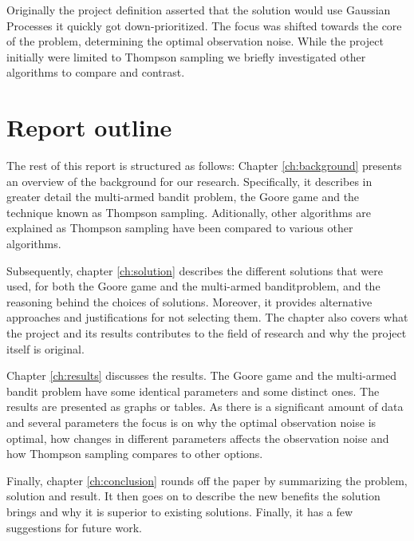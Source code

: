 Originally the project definition asserted that the solution would use Gaussian Processes it quickly got down-prioritized.
The focus was shifted towards the core of the problem, determining the optimal observation noise. While
the project initially were limited to Thompson sampling we briefly investigated other algorithms to compare
and contrast. 

\section{Report outline}
The rest of this report is structured as follows: Chapter
\ref{ch:background} presents an overview of the background for our research.
Specifically, it describes in greater detail the multi-armed bandit problem, the Goore game and the
technique known as Thompson sampling. Aditionally, other algorithms are explained as Thompson sampling
have been compared to various other algorithms.

Subsequently, chapter \ref{ch:solution} describes the different solutions that were used, for both the Goore game
and the multi-armed banditproblem, and the reasoning behind the choices of solutions. Moreover, it provides 
alternative approaches and justifications for not selecting them. The chapter also covers what the project
and its results contributes to the field of research and why the project itself is original. 

Chapter \ref{ch:results} discusses the results. The Goore game and the multi-armed bandit problem have some
identical parameters and some distinct ones. The results are presented as graphs or tables. As there is a significant
amount of data and several parameters the focus is on why the optimal observation noise is optimal, how changes
in different parameters affects the observation noise and how Thompson sampling compares to other options.

Finally, chapter \ref{ch:conclusion} rounds off the paper by summarizing the problem, solution and result. It then goes
on to describe the new benefits the solution brings and why it is superior to existing solutions. Finally, it has a few 
suggestions for future work.
